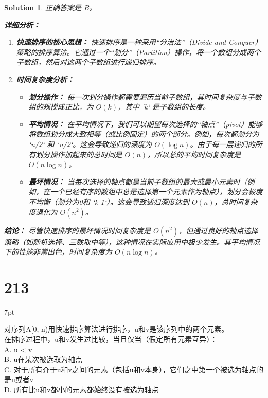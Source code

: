\documentclass[UTF8]{report}
\newtheorem{solution}{Solution}
\theoremstyle{MyLineTheoremStyle} %
\theoremstyle{MyBlockTheoremStyle} %
\theoremstyle{MySubsubsectionStyle} %
\newenvironment{graybox}{%
        \def\FrameCommand{%
        \hspace{1pt}%
        {\color{gray}\small \vrule width 2pt}%
        {\color{graybox_color}\vrule width 4pt}%
        \colorbox{graybox_color}%
        }%
        \MakeFramed{\advance\hsize-\width\FrameRestore}%
        \noindent\hspace{-4.55pt}%
        \begin{adjustwidth}{}{7pt}%
        \vspace{2pt}\vspace{2pt}%
        }
        {%
        \vspace{2pt}\end{adjustwidth}\endMakeFramed%
        }
\begin{document}
\begin{solution}
正确答案是 B。

\textbf{详细分析：}

\begin{enumerate}
    \item \textbf{快速排序的核心思想：}
    快速排序是一种采用“分治法”（Divide and Conquer）策略的排序算法。它通过一个“划分”（Partition）操作，将一个数组分成两个子数组，然后对这两个子数组进行递归排序。

    \item \textbf{时间复杂度分析：}
    \begin{itemize}
        \item \textbf{划分操作：} 每一次划分操作都需要遍历当前子数组，其时间复杂度与子数组的规模成正比，为 $O(k)$，其中 `k` 是子数组的长度。
        \item \textbf{平均情况：} 在平均情况下，我们可以期望每次选择的“轴点”（pivot）能够将数组划分成大致相等（或比例固定）的两个部分。例如，每次都划分为 `n/2` 和 `n/2`。这会导致递归的深度为 $O(\log n)$。由于每一层递归的所有划分操作加起来的总时间是 $O(n)$，所以总的平均时间复杂度是 $O(n \log n)$。
        \item \textbf{最坏情况：} 当每次选择的轴点都是当前子数组的最大或最小元素时（例如，在一个已经有序的数组中总是选择第一个元素作为轴点），划分会极度不均衡（划分为0和 `k-1`）。这会导致递归深度达到 $O(n)$，总时间复杂度退化为 $O(n^2)$。
    \end{itemize}
\end{enumerate}

\textbf{结论：}
尽管快速排序的最坏情况时间复杂度是 $O(n^2)$，但通过良好的轴点选择策略（如随机选择、三数取中等），这种情况在实际应用中极少发生。其平均情况下的性能非常出色，时间复杂度为 $O(n \log n)$。
\end{solution}

\section*{213}
\begin{graybox}
对序列A[0, n)用快速排序算法进行排序，u和v是该序列中的两个元素。\\
在排序过程中，u和v发生过比较，当且仅当（假定所有元素互异）：\\
A. u < v\\
B. u在某次被选取为轴点\\
C. 对于所有介于u和v之间的元素（包括u和v本身），它们之中第一个被选为轴点的是u或者v\\
D. 所有比u和v都小的元素都始终没有被选为轴点
\end{graybox}
\end{document}
